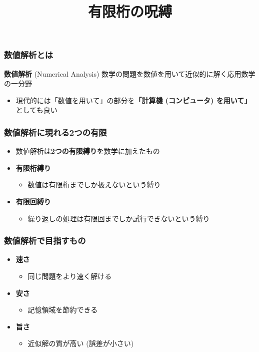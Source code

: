 \documentclass[dvipdfmx,aspectratio=169,20pt]{beamer}
\title{有限桁の呪縛}
\date[\todey]{}
\begin{document}
\frame{\titlepage}

\begin{frame}
\frametitle{数値解析とは}
\begin{block}{{\bf 数値解析} {\small (Numerical Analysis)}}
数学の問題を数値を用いて近似的に解く応用数学の一分野
\end{block}
\begin{itemize}
    \item 現代的には「数値を用いて」の部分を{\bf 「計算機 (コンピュータ) を用いて」}としても良い
\end{itemize}
\end{frame}
\begin{frame}
\frametitle{{\large 数値解析に現れる2つの有限}}
\begin{itemize}
    \setlength{\itemsep}{0.5cm}
    \item 数値解析は{\bf 2つの有限縛り}を数学に加えたもの
    \item {\bf 有限桁縛り}
    \begin{itemize}
        \item 数値は有限桁までしか扱えないという縛り
    \end{itemize}
    \item {\bf 有限回縛り}
    \begin{itemize}
        \item 繰り返しの処理は有限回までしか試行できないという縛り
    \end{itemize}
\end{itemize}
\end{frame}
\begin{frame}
\frametitle{{\large 数値解析で目指すもの}}
\begin{itemize}
    \setlength{\itemsep}{0.5cm}
    \item {\bf 速さ}
    \begin{itemize}
        \item 同じ問題をより速く解ける
    \end{itemize}
    \item {\bf 安さ}
    \begin{itemize}
        \item 記憶領域を節約できる
    \end{itemize}
    \item {\bf 旨さ}
    \begin{itemize}
        \item 近似解の質が高い (誤差が小さい)
    \end{itemize}
\end{itemize}
\end{frame}
\end{document}
